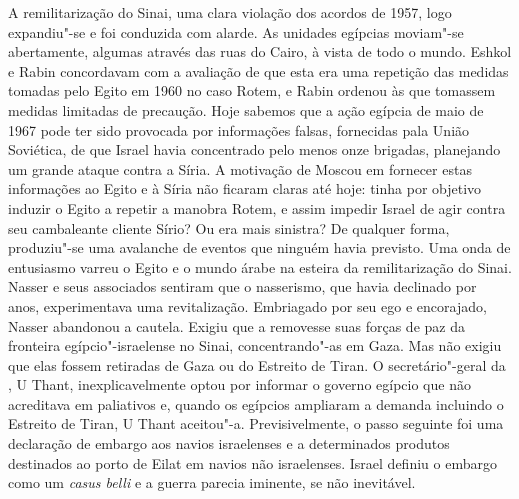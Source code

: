 A remilitarização do Sinai, uma clara violação dos acordos de 1957, logo
expandiu"-se e foi conduzida com alarde. As unidades egípcias moviam"-se
abertamente, algumas através das ruas do Cairo, à vista de todo o mundo.
Eshkol e Rabin concordavam com a avaliação de que esta era uma repetição
das medidas tomadas pelo Egito em 1960 no caso Rotem, e Rabin ordenou às
 que tomassem medidas limitadas de precaução. Hoje sabemos que a ação
egípcia de maio de 1967 pode ter sido provocada por informações falsas,
fornecidas pala União Soviética, de que Israel havia concentrado pelo
menos onze brigadas, planejando um grande ataque contra a Síria. A
motivação de Moscou em fornecer estas informações ao Egito e à Síria não
ficaram claras até hoje: tinha por objetivo induzir o Egito a repetir a
manobra Rotem, e assim impedir Israel de agir contra seu cambaleante
cliente Sírio? Ou era mais sinistra? De qualquer forma, produziu"-se uma
avalanche de eventos que ninguém havia previsto. Uma onda de entusiasmo
varreu o Egito e o mundo árabe na esteira da remilitarização do Sinai.
Nasser e seus associados sentiram que o nasserismo, que havia declinado
por anos, experimentava uma revitalização. Embriagado por seu ego e
encorajado, Nasser abandonou a cautela. Exigiu que a  removesse suas
forças de paz da fronteira egípcio"-israelense no Sinai, concentrando"-as
em Gaza. Mas não exigiu que elas fossem retiradas de Gaza ou do
Estreito de Tiran. O secretário"-geral da , U Thant,
inexplicavelmente optou por informar o governo egípcio que não
acreditava em paliativos e, quando os egípcios ampliaram a demanda
incluindo o Estreito de Tiran, U Thant aceitou"-a. Previsivelmente, o
passo seguinte foi uma declaração de embargo aos navios israelenses e a
determinados produtos destinados ao porto de Eilat em navios
não israelenses. Israel definiu o embargo como um \emph{casus belli}
e a guerra parecia iminente, se não inevitável.

